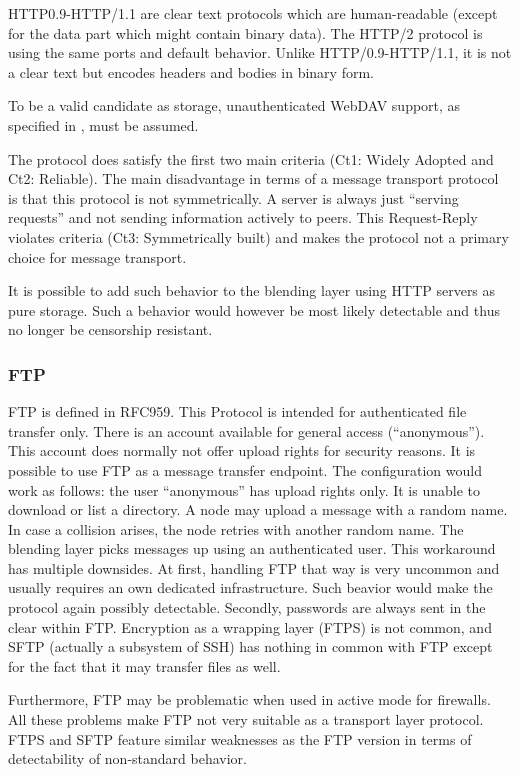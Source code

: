HTTP0.9-HTTP/1.1 are clear text protocols which are human-readable (except for the data part which might contain binary data). The HTTP/2\cite{rfc7540} protocol is using the same ports and default behavior. Unlike HTTP/0.9-HTTP/1.1, it is not a clear text but encodes headers and bodies in binary form. 

To be a valid candidate as storage, unauthenticated WebDAV support, as specified in \cite{rfc4918}, must be assumed.

The protocol does satisfy the first two main criteria (Ct1: Widely Adopted and Ct2: Reliable). The main disadvantage in terms of a message transport protocol is that this protocol is not symmetrically. A server is always just ``serving requests'' and not sending information actively to peers. This Request-Reply violates criteria (Ct3: Symmetrically built) and makes the protocol not a primary choice for message transport. 

It is possible to add such behavior to the blending layer using HTTP servers as pure storage. Such a behavior would however be most likely detectable and thus no longer be censorship resistant.

\subsubsection{FTP}
FTP is defined in RFC959\cite{rfc959}. This Protocol is intended for authenticated file transfer only. There is an account available for general access (``anonymous''). This account does normally not offer upload rights for security reasons. It is possible to use FTP as a message transfer endpoint. The configuration would work as follows: the user ``anonymous'' has upload rights only. It is unable to download or list a directory. A node may upload a message with a random name. In case a collision arises, the node retries with another random name. The blending layer picks messages up using an authenticated user. This workaround has multiple downsides. At first, handling FTP that way is very uncommon and usually requires an own dedicated infrastructure. Such beavior would make the protocol again possibly detectable. Secondly, passwords are always sent in the clear within FTP. Encryption as a wrapping layer (FTPS) is not common, and SFTP (actually a subsystem of SSH) has nothing in common with FTP except for the fact that it may transfer files as well.

Furthermore, FTP may be problematic when used in active mode for firewalls. All these problems make FTP not very suitable as a transport layer protocol. FTPS and SFTP feature similar weaknesses as the FTP version in terms of detectability of non-standard behavior.

